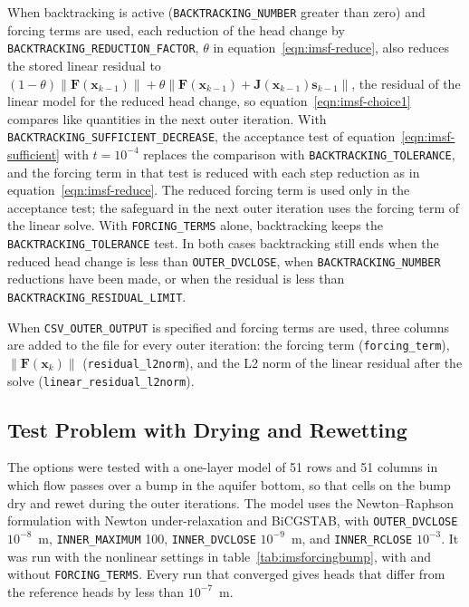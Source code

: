 When backtracking is active (\texttt{BACKTRACKING\_NUMBER} greater than zero) and forcing terms are used, each reduction of the head change by \texttt{BACKTRACKING\_REDUCTION\_FACTOR}, $\theta$ in equation~\ref{eqn:imsf-reduce}, also reduces the stored linear residual to $(1 - \theta) \| \mathbf{F}(\mathbf{x}_{k-1}) \| + \theta \| \mathbf{F}(\mathbf{x}_{k-1}) + \mathbf{J}(\mathbf{x}_{k-1}) \mathbf{s}_{k-1} \|$, the residual of the linear model for the reduced head change, so equation~\ref{eqn:imsf-choice1} compares like quantities in the next outer iteration. With \texttt{BACKTRACKING\_SUFFICIENT\_DECREASE}, the acceptance test of equation~\ref{eqn:imsf-sufficient} with $t = 10^{-4}$ replaces the comparison with \texttt{BACKTRACKING\_TOLERANCE}, and the forcing term in that test is reduced with each step reduction as in equation~\ref{eqn:imsf-reduce}. The reduced forcing term is used only in the acceptance test; the safeguard in the next outer iteration uses the forcing term of the linear solve. With \texttt{FORCING\_TERMS} alone, backtracking keeps the \texttt{BACKTRACKING\_TOLERANCE} test. In both cases backtracking still ends when the reduced head change is less than \texttt{OUTER\_DVCLOSE}, when \texttt{BACKTRACKING\_NUMBER} reductions have been made, or when the residual is less than \texttt{BACKTRACKING\_RESIDUAL\_LIMIT}.

When \texttt{CSV\_OUTER\_OUTPUT} is specified and forcing terms are used, three columns are added to the file for every outer iteration: the forcing term (\texttt{forcing\_term}), $\| \mathbf{F}(\mathbf{x}_k) \|$ (\texttt{residual\_l2norm}), and the L2 norm of the linear residual after the solve (\texttt{linear\_residual\_l2norm}).

\subsection{Test Problem with Drying and Rewetting}

The options were tested with a one-layer model of 51 rows and 51 columns in which flow passes over a bump in the aquifer bottom, so that cells on the bump dry and rewet during the outer iterations. The model uses the Newton--Raphson formulation with Newton under-relaxation and BiCGSTAB, with \texttt{OUTER\_DVCLOSE} $10^{-8}$~m, \texttt{INNER\_MAXIMUM} 100, \texttt{INNER\_DVCLOSE} $10^{-9}$~m, and \texttt{INNER\_RCLOSE} $10^{-3}$. It was run with the nonlinear settings in table~\ref{tab:imsforcingbump}, with and without \texttt{FORCING\_TERMS}. Every run that converged gives heads that differ from the reference heads by less than $10^{-7}$~m.

